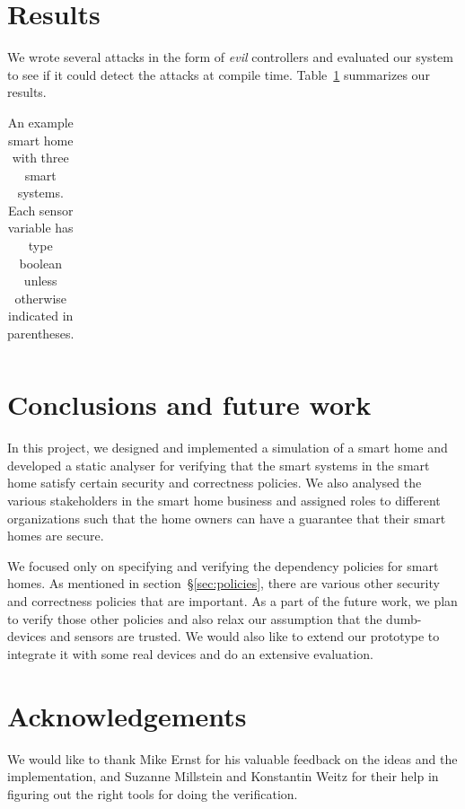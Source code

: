 \documentclass{article}
\begin{document}
\section{Results}
We wrote several attacks in the form of \textit{evil} controllers and evaluated our system to see if it could detect the attacks at compile time. Table~\ref{table:results} summarizes our results.
\begin{table}[h]
\begin{center}
\begin{tabular}{|p{4cm}|p{3cm}|p{4.5cm}|p{2cm}|}
\hline
\end{tabular}
\caption{\small{An example smart home with three smart systems. Each sensor variable has type boolean unless otherwise indicated in parentheses.}}
\label{table:results}
\end{center}
\end{table}

\section{Conclusions and future work}
In this project, we designed and implemented a simulation of a smart home and developed a static analyser for verifying that the smart systems in the smart home satisfy certain security and correctness policies. We also analysed the various stakeholders in the smart home business and assigned roles to different organizations such that the home owners can have a guarantee that their smart homes are secure. 

We focused only on specifying and verifying the dependency policies for smart homes. As mentioned in section~\S\ref{sec:policies}, there are various other security and correctness policies that are important. As a part of the future work, we plan to verify those other policies and also relax our assumption that the dumb-devices and sensors are trusted. We would also like to extend our prototype to integrate it with some real devices and do an extensive evaluation.
\section{Acknowledgements}
We would like to thank Mike Ernst for his valuable feedback on the ideas and the implementation, and Suzanne Millstein and Konstantin Weitz for their help in figuring out the right tools for doing the verification.


\end{document}
